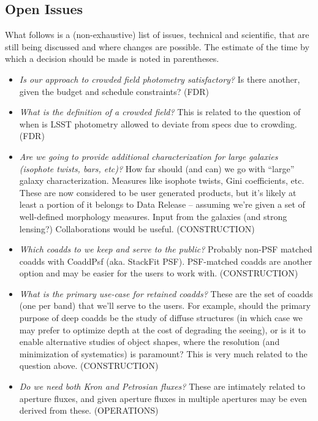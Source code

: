 \documentclass[SE,lsstdraft,toc]{lsstdoc}
\begin{document}
\begin{openissues}
\subsection{Open Issues}

What follows is a (non-exhaustive) list of issues, technical and scientific, that are still being discussed and where changes are possible. The estimate of the time by which a decision should be made is noted in parentheses.

\begin{itemize}
    \item \emph{Is our approach to crowded field photometry satisfactory?} Is there another, given the budget and schedule constraints? (FDR)

    \item \emph{What is the definition of a crowded field?} This is related to the question of when is LSST photometry allowed to deviate from \SRD specs due to crowding. (FDR)

    \item \emph{Are we going to provide additional characterization for large galaxies (isophote twists, bars, etc)?} How far should (and can) we go with ``large'' galaxy characterization. Measures like isophote twists, Gini coefficients, etc. These are now considered to be  user generated products, but it's likely at least a portion of it belongs to Data Release -- assuming we're given a set of well-defined morphology measures. Input from the galaxies (and strong lensing?) Collaborations would be useful. (CONSTRUCTION)

    \item \emph{Which coadds to we keep and serve to the public?} Probably non-PSF matched coadds with CoaddPsf (aka. StackFit PSF). PSF-matched coadds are another option and may be easier for the users to work with. (CONSTRUCTION)

    \item \emph{What is the primary use-case for retained coadds?} These are the set of coadds (one per band) that we'll serve to the users. For example, should the primary purpose of deep coadds be the study of diffuse structures (in which case we may prefer to optimize depth at the cost of degrading the seeing), or is it to enable alternative studies of object shapes, where the resolution (and minimization of systematics) is paramount? This is very much related to the question above. (CONSTRUCTION)

    \item \emph{Do we need both Kron and Petrosian fluxes?} These are intimately related to aperture fluxes, and given aperture fluxes in multiple apertures may be even derived from these. (OPERATIONS)


\end{itemize}
\end{openissues}
\end{document}
